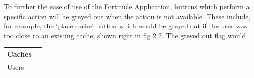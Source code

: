 To further the ease of use of the Fortitude Application, buttons which perform a specific action will be greyed out when the action is not available. These include, for example, the ‘place cache’ button which would be greyed out if the user was too close to an existing cache, shown right in fig 2.2. The greyed out flag would

\begin{tabular}{| p{} | p{} |}
	\hline
	\vspace{10mm}
	Caches & \lipsum[1] \\
	\hline
	\vspace{10mm}
	Users & \lipsum[2] \\
	\hline
\end{tabular}
